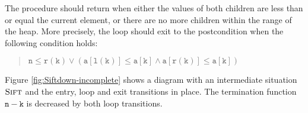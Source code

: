 \documentclass[english,submission]{eptcs}
\newcommand{\procedurelabel}[1]{\small \texttt{#1}}
\newcommand{\situationrule}{\vspace{-1.2ex}\mbox{}\rule[1.2ex]{\linewidth}{0.4pt}\mbox{}}
\newcommand{\procedurerule}{\situationrule}
\newcommand{\invariant}[1]{\small \ensuremath{\mathtt{#1}}}
\newcommand{\declaration}[1]{\small \ensuremath{\mathtt{#1}}}
\newcommand{\ibpid}[1]{\texttt{#1}}
\newcommand{\ibpkw}[1]{\textsf{\textbf{#1}}}
\begin{document}
The procedure should return when either the values of both children
are less than or equal the current element, or there are no more children
within the range of the heap. More precisely, the loop should exit
to the postcondition when the following condition holds:
\begin{quote}
$\mathtt{n\le r(k)\vee(a[l(k)]\le a[k]\land a[r(k)]\le a[k])}$
\end{quote}
\noindent Figure \ref{fig:Siftdown-incomplete} shows a diagram with
an intermediate situation $\textsc{Sift}$ and the entry, loop and
exit transitions in place. The termination function $\mathtt{n-k}$
is decreased by both loop transitions.
\begin{figure}
\noindent \begin{centering}
\end{centering}
\end{figure}
\end{document}

